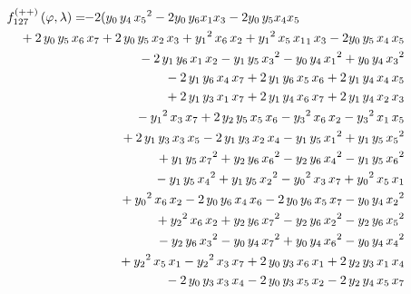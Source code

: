 \documentclass[a4paper,12pt]{book}
\begin{document}
\begin{eqnarray*}
\lefteqn{f_{127}^{\left( ++\right) }\left( \varphi ,\lambda \right)
=\!\!-2(y_{0}\,y_{4}\,x_{5}{}^{2}-2y_{0}\,y_{6}x_{1}x_{3}-2y_{0}%
\,y_{5}x_{4}x_{5}} \\
&&\mbox{}+2\,{y_{0}}\,{y_{5}}\,{x_{6}}\,{x_{7}}+2\,{y_{0}}\,{y_{5}}\,{x_{2}}%
\,{x_{3}}+{y_{1}}^{2}\,{x_{6}}\,{x_{2}}+{y_{1}}^{2}\,{x_{5}}\,{x_{1}}%
_{1}\,x_{3}-2y_{0}\,y_{5}\,x_{4}\,x_{5} \\
&&\mbox{}-2\,{y_{1}}\,{y_{6}}\,{x_{1}}\,{x_{2}}-{y_{1}}\,{y_{5}}\,{x_{3}}%
^{2}-{y_{0}}\,{y_{4}}\,{x_{1}}^{2}+{y_{0}}\,{y_{4}}\,{x_{3}}^{2} \\
&&\mbox{}-2\,{y_{1}}\,{y_{6}}\,{x_{4}}\,{x_{7}}+2\,{y_{1}}\,{y_{6}}\,{x_{5}}%
\,{x_{6}}+2\,{y_{1}}\,{y_{4}}\,{x_{4}}\,{x_{5}} \\
&&\mbox{}+2\,{y_{1}}\,{y_{3}}\,{x_{1}}\,{x_{7}}+2\,{y_{1}}\,{y_{4}}\,{x_{6}}%
\,{x_{7}}+2\,{y_{1}}\,{y_{4}}\,{x_{2}}\,{x_{3}} \\
&&\mbox{}-{y_{1}}^{2}\,{x_{3}}\,{x_{7}}+2\,{y_{2}}\,{y_{5}}\,{x_{5}}\,{x_{6}}%
-{y_{3}}^{2}\,{x_{6}}\,{x_{2}}-{y_{3}}^{2}\,{x_{1}}\,{x_{5}} \\
&&\mbox{}+2\,{y_{1}}\,{y_{3}}\,{x_{3}}\,{x_{5}}-2\,{y_{1}}\,{y_{3}}\,{x_{2}}%
\,{x_{4}}-{y_{1}}\,{y_{5}}\,{x_{1}}^{2}+{y_{1}}\,{y_{5}}\,{x_{5}}^{2} \\
&&\mbox{}+{y_{1}}\,{y_{5}}\,{x_{7}}^{2}+{y_{2}}\,{y_{6}}\,{x_{6}}^{2}-{y_{2}}%
\,{y_{6}}\,{x_{4}}^{2}-{y_{1}}\,{y_{5}}\,{x_{6}}^{2} \\
&&\mbox{}-{y_{1}}\,{y_{5}}\,{x_{4}}^{2}+{y_{1}}\,{y_{5}}\,{x_{2}}^{2}-{y_{0}}%
^{2}\,{x_{3}}\,{x_{7}}+{y_{0}}^{2}\,{x_{5}}\,{x_{1}} \\
&&\mbox{}+{y_{0}}^{2}\,{x_{6}}\,{x_{2}}-2\,{y_{0}}\,{y_{6}}\,{x_{4}}\,{x_{6}}%
-2\,{y_{0}}\,{y_{6}}\,{x_{5}}\,{x_{7}}-{y_{0}}\,{y_{4}}\,{x_{2}}^{2} \\
&&\mbox{}+{y_{2}}^{2}\,{x_{6}}\,{x_{2}}+{y_{2}}\,{y_{6}}\,{x_{7}}^{2}-{y_{2}}%
\,{y_{6}}\,{x_{2}}^{2}-{y_{2}}\,{y_{6}}\,{x_{5}}^{2} \\
&&\mbox{}-{y_{2}}\,{y_{6}}\,{x_{3}}^{2}-{y_{0}}\,{y_{4}}\,{x_{7}}^{2}+{y_{0}}%
\,{y_{4}}\,{x_{6}}^{2}-{y_{0}}\,{y_{4}}\,{x_{4}}^{2} \\
&&\mbox{}+{y_{2}}^{2}\,{x_{5}}\,{x_{1}}-{y_{2}}^{2}\,{x_{3}}\,{x_{7}}+2\,{%
y_{0}}\,{y_{3}}\,{x_{6}}\,{x_{1}}+2\,{y_{2}}\,{y_{3}}\,{x_{1}}\,{x_{4}} \\
&&\mbox{}-2\,{y_{0}}\,{y_{3}}\,{x_{3}}\,{x_{4}}-2\,{y_{0}}\,{y_{3}}\,{x_{5}}%
\,{x_{2}}-2\,{y_{2}}\,{y_{4}}\,{x_{5}}\,{x_{7}} \\

\end{eqnarray*}
\end{document}
